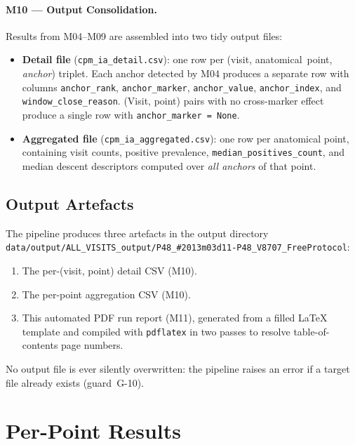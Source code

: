 \documentclass[a4paper,11pt]{article}
\begin{document}
\paragraph{M10 --- Output Consolidation.}
Results from M04--M09 are assembled into two tidy output files:
\begin{itemize}
  \item \textbf{Detail file} (\texttt{cpm\_ia\_detail.csv}): one row per
        (visit, anatomical~point, \emph{anchor}) triplet. Each anchor detected by M04
        produces a separate row with columns \texttt{anchor\_rank},
        \texttt{anchor\_marker}, \texttt{anchor\_value}, \texttt{anchor\_index},
        and \texttt{window\_close\_reason}.
        (Visit, point) pairs with no cross-marker effect produce a single row with
        \texttt{anchor\_marker = None}.
  \item \textbf{Aggregated file} (\texttt{cpm\_ia\_aggregated.csv}): one row per
        anatomical point, containing visit counts, positive prevalence,
        \texttt{median\_positives\_count}, and median descent descriptors computed over
        \emph{all anchors} of that point.
\end{itemize}

\subsection{Output Artefacts}

The pipeline produces three artefacts in the output directory \texttt{data/output/ALL\_VISITS\_output/P48\_\#2013m03d11-P48\_V8707\_FreeProtocol}:
\begin{enumerate}
  \item The per-(visit, point) detail CSV (M10).
  \item The per-point aggregation CSV (M10).
  \item This automated PDF run report (M11), generated from a filled \LaTeX{} template
        and compiled with \texttt{pdflatex} in two passes to resolve table-of-contents
        page numbers.
\end{enumerate}
No output file is ever silently overwritten: the pipeline raises an error if a target
file already exists (guard~G-10).

\section{Per-Point Results}
\end{document}
